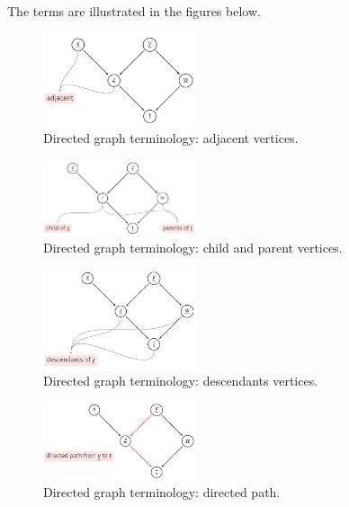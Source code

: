 The terms are illustrated in the figures below. 
\begin{figure}[H]
    \centering
    \includegraphics[width=0.4\textwidth]{figs/Graphs/dag_adjacent_vertices.PNG}    
    \caption{Directed graph terminology: adjacent vertices.}
    \label{fig:dag_adjacent_vertices}
\end{figure}
\begin{figure}[H]
    \centering
    \includegraphics[width=0.4\textwidth]{figs/Graphs/dag_child_and_parent.PNG}    
    \caption{Directed graph terminology: child and parent vertices.}
    \label{fig:dag_child_and_parent}
\end{figure}
\begin{figure}[H]
    \centering
    \includegraphics[width=0.4\textwidth]{figs/Graphs/dag_descendents.PNG}    
    \caption{Directed graph terminology: descendants vertices.}
    \label{fig:dag_descendents}
\end{figure}
\begin{figure}[H]
    \centering
    \includegraphics[width=0.4\textwidth]{figs/Graphs/dag_directed_path.PNG}    
    \caption{Directed graph terminology: directed path.}
    \label{fig:dag_directed_path}
\end{figure}
